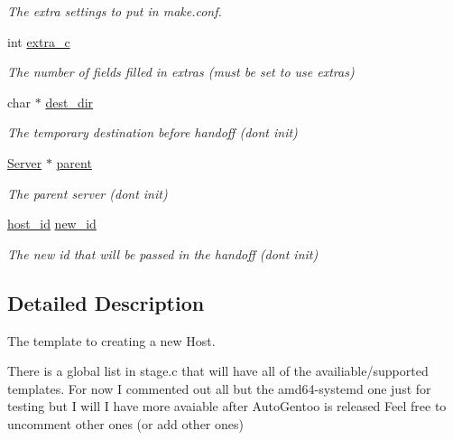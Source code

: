 \begin{DoxyCompactItemize}
\begin{tabbing}
\end{tabbing}\begin{DoxyCompactList}\small\item\em The extra settings to put in make.\+conf. \end{DoxyCompactList}\item 
int \mbox{\hyperlink{struct_____host_template_a36e3e69b0dfda8fe28376c6bc89ec0c0}{extra\+\_\+c}}
\begin{DoxyCompactList}\small\item\em The number of fields filled in extras (must be set to use extras) \end{DoxyCompactList}\item 
char $\ast$ \mbox{\hyperlink{struct_____host_template_afca1e49a19d36cff4e745d615b33ab7a}{dest\+\_\+dir}}
\begin{DoxyCompactList}\small\item\em The temporary destination before handoff (don\textquotesingle{}t init) \end{DoxyCompactList}\item 
\mbox{\hyperlink{server_8h_a705d964b8a67edeeb3943273a397e4c2}{Server}} $\ast$ \mbox{\hyperlink{struct_____host_template_aa8239544f5fd3a31a47940c7c0de5c5c}{parent}}
\begin{DoxyCompactList}\small\item\em The parent server (don\textquotesingle{}t init) \end{DoxyCompactList}\item 
\mbox{\hyperlink{host_8h_ad9a5413d8b4376a70706368c97972c2b}{host\+\_\+id}} \mbox{\hyperlink{struct_____host_template_ae7564721dc0d66845c5238ae141035c8}{new\+\_\+id}}
\begin{DoxyCompactList}\small\item\em The new id that will be passed in the handoff (don\textquotesingle{}t init) \end{DoxyCompactList}\end{DoxyCompactItemize}


\subsection{Detailed Description}
The template to creating a new Host. 

There is a global list in stage.\+c that will have all of the availiable/supported templates. For now I commented out all but the amd64-\/systemd one just for testing but I will I have more avaiable after Auto\+Gentoo is released Feel free to uncomment other ones (or add other ones) 

